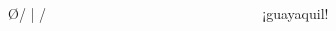 \documentclass[spanish]{beamer}
\begin{document}

\begin{frame}[fragile]
  \begin{columns}[onlytextwidth,T]
    \begin{column}{.5\textwidth}
      \begin{code}


    \O/
     |
    / \


      \end{code}
    \end{column}
    \begin{column}{.5\textwidth}
      \begin{code}


¡guayaquil!




      \end{code}
    \end{column}
  \end{columns}
\end{frame}

\end{document}
